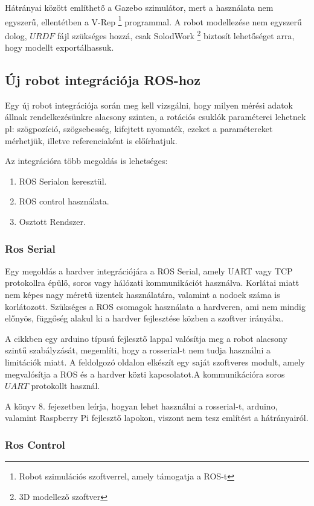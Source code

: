 Hátrányai között említhető a Gazebo szimulátor, mert a használata nem egyszerű, ellentétben a V-Rep \footnote{Robot szimulációs szoftverrel, amely támogatja a ROS-t} programmal. A robot modellezése nem egyszerű dolog, $URDF$ fájl szükséges hozzá, csak SolodWork \footnote{3D modellező szoftver} biztosít  lehetőséget arra, hogy modellt exportálhassuk.

\subsection{Új robot integrációja ROS-hoz}
Egy új robot integrációja során meg kell vizsgálni, hogy milyen mérési adatok állnak rendelkezésünkre alacsony szinten, a rotációs csuklók paraméterei lehetnek pl: szögpozíció, szögsebesség, kifejtett nyomaték, ezeket a paramétereket mérhetjük, illetve referenciaként is előírhatjuk. 

Az integrációra több megoldás is lehetséges:
\begin{enumerate}[label=(\alph*)]
	\item ROS Serialon keresztül.
	\item ROS control használata.
	\item Osztott Rendszer.
\end{enumerate}

\subsubsection*{Ros Serial}
Egy megoldás a hardver integrációjára a ROS Serial, amely UART vagy TCP protokollra épülő, soros vagy hálózati kommunikációt használva. Korlátai miatt \cite{RosSerial} nem képes nagy méretű üzentek használatára, valamint a nodoek száma is korlátozott. Szükséges a ROS csomagok használata a hardveren, ami nem mindig előnyös, függőség alakul ki a hardver fejlesztése közben a szoftver irányába.

A \cite{ROSArduino2013} cikkben egy arduino típusú fejlesztő lappal valósítja meg a robot alacsony szintű szabályzását, megemlíti, hogy a rosserial-t nem tudja használni a limitációk miatt. A feldolgozó oldalon elkészít egy saját szoftveres modult, amely megvalósítja a ROS és a hardver közti kapcsolatot.A kommunikációra soros $UART$ protokollt használ.

A \cite{ROSRoboticsByExampleSecEd} könyv 8. fejezetben leírja, hogyan lehet használni a rosserial-t, arduino, valamint Raspberry Pi fejlesztő lapokon, viszont nem tesz említést a hátrányairól.

\subsubsection*{Ros Control}

